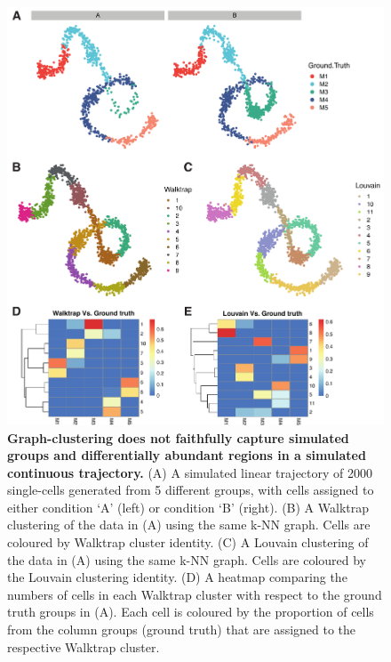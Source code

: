 \documentclass[
]{article}
\begin{document}
\begin{figure}
\centering
\includegraphics{suppl_figs/suppl_fig4.pdf}
\caption{\label{fig:sup-fig-4}\textbf{Graph-clustering does not faithfully capture simulated groups and differentially abundant regions in a simulated continuous trajectory.}
(A) A simulated linear trajectory of 2000 single-cells generated from 5 different groups, with cells assigned to either condition `A' (left) or condition `B' (right).
(B) A Walktrap clustering of the data in (A) using the same k-NN graph. Cells are coloured by Walktrap cluster identity.
(C) A Louvain clustering of the data in (A) using the same k-NN graph. Cells are coloured by the Louvain clustering identity.
(D) A heatmap comparing the numbers of cells in each Walktrap cluster with respect to the ground truth groups in (A). Each cell is coloured by the proportion of cells from the column groups (ground truth) that are assigned to the respective Walktrap cluster.}
\end{figure}
\end{document}
